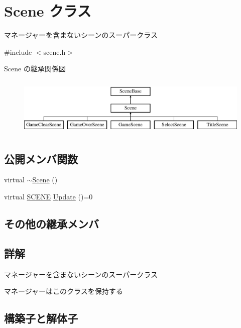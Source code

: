 \hypertarget{class_scene}{}\section{Scene クラス}
\label{class_scene}


マネージャーを含まないシーンのスーパークラス  




{\ttfamily \#include $<$scene.\+h$>$}

Scene の継承関係図\begin{figure}[H]
\begin{center}
\leavevmode
\includegraphics[height=2.823529cm]{class_scene}
\end{center}
\end{figure}
\subsection*{公開メンバ関数}
\begin{DoxyCompactItemize}
\item 
virtual \mbox{\hyperlink{class_scene_aa0a5be58e2ee2d1fdafc5fb46b5e661e}{$\sim$\+Scene}} ()
\item 
virtual \mbox{\hyperlink{scene__base_8h_a24cee5343fb9d0706ead6e8601f363be}{S\+C\+E\+NE}} \mbox{\hyperlink{class_scene_acb50f8104e5a7cfecbdececa7d5f1b39}{Update}} ()=0
\end{DoxyCompactItemize}
\subsection*{その他の継承メンバ}


\subsection{詳解}
マネージャーを含まないシーンのスーパークラス 

マネージャーはこのクラスを保持する 

\subsection{構築子と解体子}
\mbox{\label{class_scene_aa0a5be58e2ee2d1fdafc5fb46b5e661e}} 

